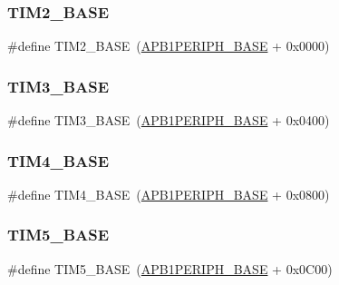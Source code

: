 \subsubsection{\texorpdfstring{TIM2\_BASE}{TIM2\_BASE}}
{\footnotesize\ttfamily \#define T\+I\+M2\+\_\+\+B\+A\+SE~(\mbox{\hyperlink{group___peripheral__memory__map_ga45666d911f39addd4c8c0a0ac3388cfb}{A\+P\+B1\+P\+E\+R\+I\+P\+H\+\_\+\+B\+A\+SE}} + 0x0000)}

\mbox{\label{group___peripheral__memory__map_gaf0c34a518f87e1e505cd2332e989564a}} 
\subsubsection{\texorpdfstring{TIM3\_BASE}{TIM3\_BASE}}
{\footnotesize\ttfamily \#define T\+I\+M3\+\_\+\+B\+A\+SE~(\mbox{\hyperlink{group___peripheral__memory__map_ga45666d911f39addd4c8c0a0ac3388cfb}{A\+P\+B1\+P\+E\+R\+I\+P\+H\+\_\+\+B\+A\+SE}} + 0x0400)}

\mbox{\label{group___peripheral__memory__map_ga56e2d44b0002f316527b8913866a370d}} 
\subsubsection{\texorpdfstring{TIM4\_BASE}{TIM4\_BASE}}
{\footnotesize\ttfamily \#define T\+I\+M4\+\_\+\+B\+A\+SE~(\mbox{\hyperlink{group___peripheral__memory__map_ga45666d911f39addd4c8c0a0ac3388cfb}{A\+P\+B1\+P\+E\+R\+I\+P\+H\+\_\+\+B\+A\+SE}} + 0x0800)}

\mbox{\label{group___peripheral__memory__map_ga3e1671477190d065ba7c944558336d7e}} 
\subsubsection{\texorpdfstring{TIM5\_BASE}{TIM5\_BASE}}
{\footnotesize\ttfamily \#define T\+I\+M5\+\_\+\+B\+A\+SE~(\mbox{\hyperlink{group___peripheral__memory__map_ga45666d911f39addd4c8c0a0ac3388cfb}{A\+P\+B1\+P\+E\+R\+I\+P\+H\+\_\+\+B\+A\+SE}} + 0x0\+C00)}

